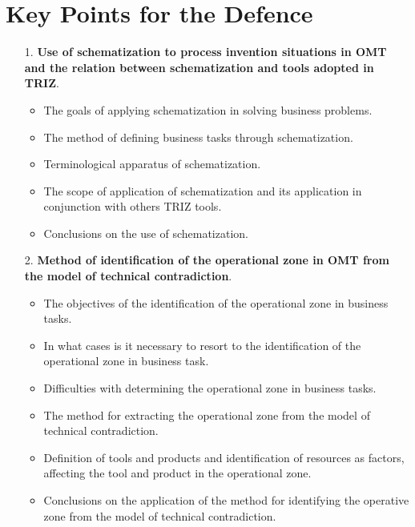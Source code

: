 \documentclass[11pt,a4paper]{book}
\begin{document}
\section{Key Points for the Defence}
\begin{itemize}
\item [1.] \textbf{Use of schematization to process invention situations in
  OMT and the relation between schematization and
  tools adopted in TRIZ}.
  \begin{itemize}
  \item The goals of applying schematization in solving business problems.
  \item The method of defining business tasks through schematization.
  \item Terminological apparatus of schematization.
  \item The scope of application of schematization and its application in
    conjunction with others TRIZ tools.
  \item Conclusions on the use of schematization.
  \end{itemize}
\item [2.] \textbf{Method of identification of the operational zone in OMT
  from the model of technical contradiction}.
  \begin{itemize}
  \item The objectives of the identification of the operational zone in
    business tasks.
  \item In what cases is it necessary to resort to the identification of the
    operational zone in business task.
  \item Difficulties with determining the operational zone in business tasks.
  \item The method for extracting the operational zone from the model of
    technical contradiction.
  \item Definition of tools and products and identification of resources as
    factors, affecting the tool and product in the operational zone.
  \item Conclusions on the application of the method for identifying the
    operative zone from the model of technical contradiction.
  \end{itemize}
\end{itemize}
\end{document}
